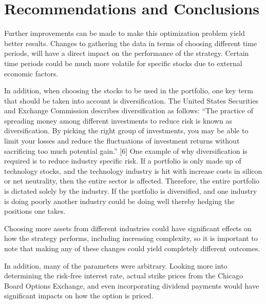 \documentclass[12pt]{article}
\begin{document}

\section{Recommendations and Conclusions}
Further improvements can be made to make this optimization problem yield better results. Changes to gathering the data in terms of choosing different time periods, will have a direct impact on the performance of the strategy. Certain time periods could be much more volatile for specific stocks due to external economic factors. 

In addition, when choosing the stocks to be used in the portfolio, one key term that should be taken into account is diversification. The United States Securities and Exchange Commission describes diversification as follows: “The practice of spreading money among different investments to reduce risk is known as diversification. By picking the right group of investments, you may be able to limit your losses and reduce the fluctuations of investment returns without sacrificing too much potential gain.” [6]  One example of why diversification is required is to reduce industry specific risk. If a portfolio is only made up of technology stocks, and the technology industry is hit with increase costs in silicon or net neutrality, then the entire sector is affected. Therefore, the entire portfolio is dictated solely by the industry. If the portfolio is diversified, and one industry is doing poorly another industry could be doing well thereby hedging the positions one takes. 

Choosing more assets from different industries could have significant effects on how the strategy performs, including increasing complexity, so it is important to note that making any of these changes could yield completely different outcomes.

	In addition, many of the parameters were arbitrary. Looking more into determining the risk-free interest rate, actual strike prices from the Chicago Board Options Exchange, and even incorporating dividend payments would have significant impacts on how the option is priced. 
	
\end{document}
